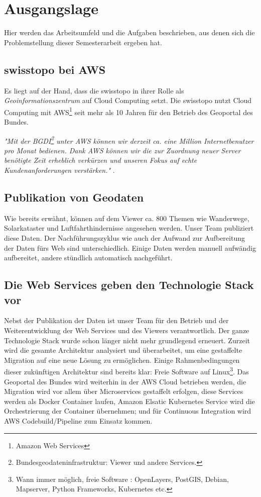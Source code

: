 \section{Ausgangslage}
Hier werden das Arbeitsumfeld und die Aufgaben beschrieben, aus denen sich die Problemstellung dieser Semesterarbeit ergeben hat.

\subsection{swisstopo bei AWS}
Es liegt auf der Hand, dass die swisstopo in ihrer Rolle als \emph{Geoinformationszentrum} auf Cloud Computing setzt. Die swisstopo nutzt Cloud Computing mit AWS\footnote{Amazon Web Services} seit mehr als 10 Jahren für den Betrieb des Geoportal des Bundes.
 
\textit{"Mit der BGDI\footnote{Bundesgeodateninfrastruktur: Viewer und andere Services.} unter AWS können wir derzeit ca. eine Million Internetbenutzer pro Monat bedienen. Dank AWS können wir die zur Zuordnung neuer Server benötigte Zeit erheblich verkürzen und unseren Fokus auf echte Kundenanforderungen verstärken."} \cite{Christ2020}.


\subsection{Publikation von Geodaten}
Wie bereits erwähnt, können auf dem Viewer ca. 800 Themen wie Wanderwege, Solarkataster und Luftfahrthindernisse angesehen werden. Unser Team publiziert diese Daten. Der Nachführungszyklus wie auch der Aufwand zur
Aufbereitung der Daten fürs Web sind unterschiedlich. Einige Daten werden manuell aufwändig aufbereitet, andere
stündlich automatisch nachgeführt.

\subsection{Die Web Services geben den Technologie Stack vor}
Nebst der Publikation der Daten ist unser Team für den Betrieb und der Weiterentwicklung der Web Services
und des Viewers verantwortlich. Der ganze Technologie Stack wurde schon länger nicht mehr grundlegend erneuert. Zurzeit wird
die gesamte Architektur analysiert und überarbeitet, um eine gestaffelte Migration auf eine neue
Lösung zu ermöglichen.
Einige Rahmenbedingungen dieser zukünftigen Architektur sind bereits klar: Freie Software auf Linux\footnote{Wann immer möglich, freie Software \cite{FS2010}: OpenLayers, PostGIS, Debian, Mapserver, Python Frameworks, Kubernetes etc.}. Das Geoportal des
Bundes wird weiterhin in der AWS Cloud betrieben werden, die Migration wird vor allem über
Microservices gestaffelt erfolgen, diese Services werden als Docker Container laufen, Amazon
Elsatic Kubernetes Service wird die Orchestrierung der Container übernehmen; und für Continuous
Integration wird AWS Codebuild/Pipeline zum Einsatz kommen.


